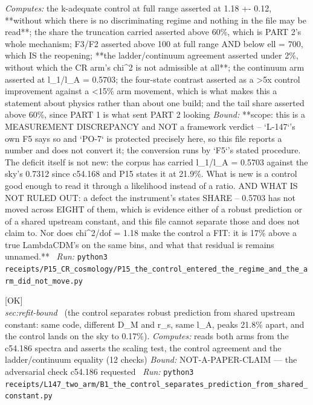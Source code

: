 \begin{description}
\emph{Computes:} the k-adequate control at full range asserted at 1.18 +- 0.12, **without which there is no discriminating regime and nothing in the file may be read**; the share the truncation carried asserted above 60\%, which is PART 2's whole mechanism; F3/F2 asserted above 100 at full range AND below ell = 700, which IS the reopening; **the ladder/continuum agreement asserted under 2\%, without which the CR arm's chi\textasciicircum{}2 is not admissible at all**; the continuum arm asserted at l\_1/l\_A = 0.5703; the four-state contrast asserted as a >5x control improvement against a <15\% arm movement, which is what makes this a statement about physics rather than about one build; and the tail share asserted above 60\%, since PART 1 is what sent PART 2 looking
 \emph{Bound:} **scope: this is a MEASUREMENT DISCREPANCY and NOT a framework verdict -- `L-147`'s own F5 says so and `PO-7` is protected precisely here, so this file reports a number and does not convert it; the conversion runs by `F5`'s stated procedure. The deficit itself is not new: the corpus has carried l\_1/l\_A = 0.5703 against the sky's 0.7312 since c54.168 and P15 states it at 21.9\%. What is new is a control good enough to read it through a likelihood instead of a ratio. AND WHAT IS NOT RULED OUT: a defect the instrument's states SHARE -- 0.5703 has not moved across EIGHT of them, which is evidence either of a robust prediction or of a shared upstream constant, and this file cannot separate those and does not claim to. Nor does chi\textasciicircum{}2/dof = 1.18 make the control a FIT: it is 17\% above a true LambdaCDM's on the same bins, and what that residual is remains unnamed.**
\ \emph{Run:} \texttt{python3 receipts/P15\_CR\_cosmology/P15\_the\_control\_entered\_the\_regime\_and\_the\_arm\_did\_not\_move.py}
\item[\label{rcpt:B1_the_control_separates_prediction_from_shared_constant}\textbf{}\quad\texttt{B1\_the\_control\_separates\_prediction\_from\_shared\_constant}]\hfill\textsf{[OK]}\\
\textit{sec:refit-bound} \ (the control separates robust prediction from shared upstream constant: same code, different D\_M and r\_s, same l\_A, peaks 21.8\% apart, and the control lands on the sky to 0.17\%). 
\emph{Computes:} reads both arms from the c54.186 spectra and asserts the scaling test, the control agreement and the ladder/continuum equality (12 checks)
 \emph{Bound:} NOT-A-PAPER-CLAIM --- the adversarial check c54.186 requested
\ \emph{Run:} \texttt{python3 receipts/L147\_two\_arm/B1\_the\_control\_separates\_prediction\_from\_shared\_constant.py}

\end{description}
